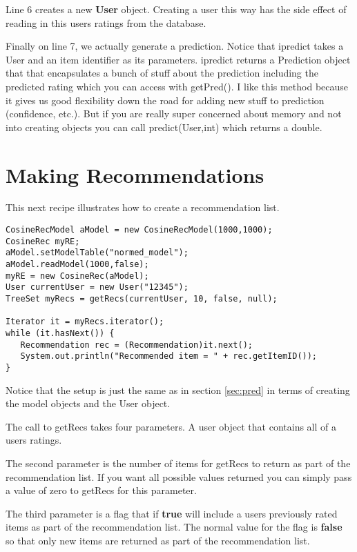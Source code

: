 \documentclass[12pt]{article}
\begin{document}
Line 6 creates a new \textbf{User} object.  Creating a user this way
has the side effect of reading in this users ratings from the
database.

Finally on line 7, we actually generate a prediction.  Notice that
ipredict takes a User and an item identifier as its parameters.
ipredict returns a Prediction object that that encapsulates a bunch of
stuff about the prediction including the predicted rating which you
can access with getPred().  I like this method because it gives us
good flexibility down the road for adding new stuff to prediction
(confidence, etc.).  But if you are really super concerned about
memory and not into creating objects you can call predict(User,int)
which returns a double.


\section{Making Recommendations}
\label{sec:recs}

This next recipe illustrates how to create a recommendation list.
\lstset{language=Java}
\begin{lstlisting}
CosineRecModel aModel = new CosineRecModel(1000,1000);
CosineRec myRE;
aModel.setModelTable("normed_model");
aModel.readModel(1000,false);
myRE = new CosineRec(aModel);
User currentUser = new User("12345");
TreeSet myRecs = getRecs(currentUser, 10, false, null);

Iterator it = myRecs.iterator();
while (it.hasNext()) {
   Recommendation rec = (Recommendation)it.next();
   System.out.println("Recommended item = " + rec.getItemID());
}
\end{lstlisting}

Notice that the setup is just the same as in section \ref{sec:pred} in
terms of creating the model objects and the User object.

The call to getRecs takes four parameters.  A user object that
contains all of a users ratings.  

The second parameter is the number of items for getRecs to return as
part of the recommendation list.  If you want all possible values
returned you can simply pass a value of zero to getRecs for this
parameter.

The third parameter is a flag that if \textbf{true} will include a
users previously rated items as part of the recommendation list.  The
normal value for the flag is \textbf{false} so that only new items are
returned as part of the recommendation list.
\end{document}
